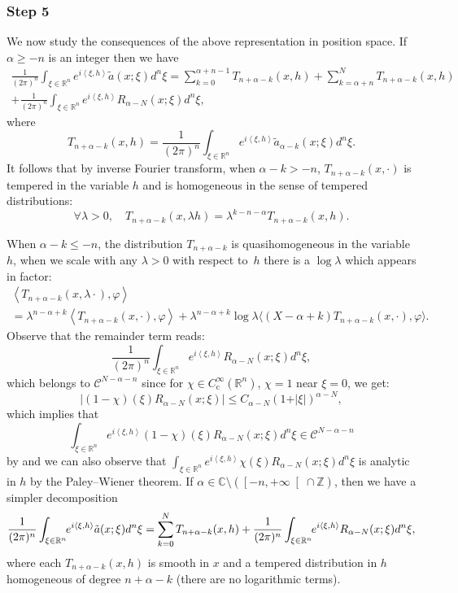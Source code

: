 \documentclass[JEP,XML,SOM,Unicode]{cedram}
\let\pazocal\mathscr
\theoremstyle{definition}
\renewcommand\c{\mathrm{c}}
\let\cv\alpha
\let\asigma a
\let\euler X
\newcommand{\clopen}[1]{\mathopen{}\mathclose{\left[#1 \right[}}
\newcommand{\step}[1]{\subsubsection*{Step #1}}
\begin{document}
\step{5} We now study the consequences of the above representation in position space. If $\cv\geqslant -n$ is an integer then we have
\begin{multline*}
\frac{1}{(2\pi)^n}\int_{\xi\in \mathbb{R}^n} e^{i\left\langle \xi,h\right\rangle} \tilde{\asigma}(x;\xi)d^n\xi =
\sum_{k=0}^{\cv+n-1} T_{n+\cv-k}(x,h) + \sum_{k=\cv+n}^{N} T_{n+\cv-k}(x,h) \\
+\frac{1}{(2\pi)^n}\int_{\xi\in \mathbb{R}^n} e^{i\left\langle \xi,h\right\rangle}R_{\cv-N}(x;\xi)d^n\xi,
\end{multline*}
where
\[
T_{n+\cv-k}(x,h)=\frac{1}{(2\pi)^n}\int_{\xi\in \mathbb{R}^n} e^{i\left\langle \xi,h\right\rangle} \tilde{\asigma}_{\cv-k}(x;\xi)d^n\xi.
\]
It follows that by inverse Fourier transform, when $\cv-k>-n $, $ T_{n+\cv-k}(x,\cdot)$ is tempered in the variable $h$ and is homogeneous in the sense of tempered distributions:
\[
\forall \lambda>0, \quad T_{n+\cv-k}(x,\lambda h)=\lambda^{k-n-\cv}T_{n+\cv-k}(x,h).
\]

When $\cv-k\leqslant -n $, the distribution $T_{n+\cv-k}$ is quasihomogeneous in the variable~$h$, \ie when we scale with any $\lambda>0$ with respect to~$h$ there is a $\log\lambda$ which appears in factor:
\begin{multline*}
\left\langle T_{n+\cv-k}(x,\lambda\cdot),\varphi\right\rangle\\
=\lambda^{n- \cv+k} \left\langle T_{n+\cv-k}(x,\cdot),\varphi\right\rangle+\lambda^{n- \cv+k}\log\lambda\langle (\euler-\cv+k) T_{n+\cv-k}(x,\cdot),\varphi\rangle.
\end{multline*}
Observe that the remainder term
reads:
\[
\frac{1}{(2\pi)^n}\int_{\xi\in \mathbb{R}^n} e^{i\left\langle \xi,h\right\rangle}R_{\cv-N}(x;\xi)d^n\xi,
\]
which belongs to $\pazocal{C}^{N-\cv-n}$ since for $\chi\in C^\infty_\c(\mathbb{R}^n)$, $\chi=1$ near $\xi=0$, we get:
\[
\vert (1-\chi)(\xi) R_{\cv-N}(x;\xi) \vert\leqslant C_{\cv-N}(1+\vert \xi\vert)^{\cv-N},
\]
which implies that
\[
\int_{\xi\in \mathbb{R}^n} e^{i\left\langle \xi,h\right\rangle}(1-\chi)(\xi)R_{\cv-N}(x;\xi)d^n\xi\in \pazocal{C}^{N-\cv-n}
\]
by \cite[Lem.\,D.2]{Dang2020} and we can also observe that $\int_{\xi\in \mathbb{R}^n} e^{i\left\langle \xi,h\right\rangle}\chi(\xi)R_{\cv-N}(x;\xi)d^n\xi$ is analytic in $h$ by the Paley--Wiener theorem.
If $\cv\in\mathbb{C}\setminus(\clopen{-n,+\infty}\cap \mathbb{Z})$, then we have a simpler decomposition
\[
\frac{1}{(2\pi)^n}\int_{\xi\in \mathbb{R}^n}\hspace*{-1mm} e^{i\left\langle \xi,h\right\rangle} \tilde{\asigma}(x;\xi)d^n\xi =
\sum_{k=0}^{N} T_{n+\cv-k}(x,h) +
\frac{1}{(2\pi)^n}\int_{\xi\in \mathbb{R}^n}\hspace*{-1mm} e^{i\left\langle \xi,h\right\rangle}R_{\cv-N}(x;\xi)d^n\xi,
\]
where each $T_{n+\cv-k}(x,h)$ is smooth in $x$ and a tempered distribution in $h$ homogeneous of degree $n+\cv-k$ (there are no logarithmic terms).
\end{document}
